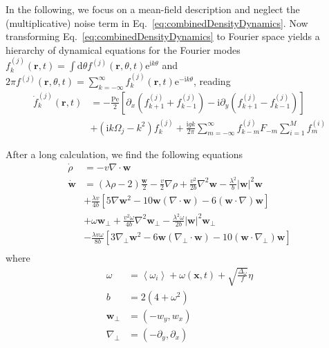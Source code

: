 \documentclass{article}
\begin{document}
In the following, we focus on a mean-field description and neglect the (multiplicative) noise term in Eq.~\eqref{eq:combinedDensityDynamics}. 
Now transforming Eq.~\eqref{eq:combinedDensityDynamics} to Fourier space yields a hierarchy of dynamical equations for the Fourier modes
$
f_k^{(j)}(\mathbf{r}, t)=\int\mathrm{d}\theta f^{(j)}(\mathbf{r},\theta,t)\mathrm{e}^{\mathrm{i}k\theta}
$
and
$
2\pi f^{(j)}(\mathbf{r},\theta ,t)=\sum_{k=-\infty}^{\infty}{f_{k}^{(j)}}(\mathbf{r},t)\mathrm{e}^{-\mathrm{i}k\theta}
$,
reading
\begin{equation}
    \begin{aligned}
        \dot{f}_k^{(j)}(\mathbf{r},t)&=-\frac{\mathrm{Pe}}{2}\left[\partial_x\left(f_{k+1}^{(j)}+f_{k-1}^{(j)}\right)-\mathrm{i}\partial_y\left(f_{k+1}^{(j)}-f_{k-1}^{(j)}\right)\right]\\
        &+ \left(\mathrm{i}k\Omega_j-k^2\right)f_k^{(j)}+\frac{\mathrm{i}gk}{2\pi}\sum_{m=-\infty}^\infty f_{k-m}^{(j)}F_{-m}\sum_{i=1}^Mf_m^{(i)}
    \end{aligned}
\end{equation}


After a long calculation, we find the following equations
\begin{equation}
    \label{eq:hydrodynamicEq}
    \begin{aligned}
        \dot{\rho}&=-v\nabla \cdot \mathbf{w}\\
        \dot{\mathbf{w}}&=(\lambda \rho -2)\frac{\mathbf{w}}{2}-\frac{v}{2}\nabla \rho +\frac{v^2}{2b}\nabla ^2\mathbf{w}-\frac{\lambda ^2}{b}|\mathbf{w}|^2\mathbf{w}\\
        &+\frac{\lambda v}{4b}\left[ 5\nabla \mathbf{w}^2-10\mathbf{w}(\nabla \cdot \mathbf{w})-6(\mathbf{w}\cdot \nabla )\mathbf{w} \right]\\
        &+\omega \mathbf{w}_{\bot}+\frac{v^2\omega}{4b}\nabla ^2\mathbf{w}_{\bot}-\frac{\lambda ^2\omega}{2b}|\mathbf{w}|^2\mathbf{w}_{\bot}\\
        &-\frac{\lambda v\omega}{8b}\left[ 3\nabla _{\bot}\mathbf{w}^2-6\mathbf{w}\left( \nabla _{\bot}\cdot \mathbf{w} \right) -10\left( \mathbf{w}\cdot \nabla _{\bot} \right) \mathbf{w} \right]\\
    \end{aligned}
\end{equation}
where 
\begin{equation}
    \begin{aligned}
        \omega &=\left< \omega _i \right> +\omega \left( \mathbf{x},t \right) +\sqrt{\frac{\Delta _{\omega}}{f}}\eta\\
        b&=2\left( 4+\omega ^2 \right)\\
        \mathbf{w}_{\bot}&=\left( -w_y,w_x \right)\\
        \nabla _{\bot}&=\left( -\partial _y,\partial _x \right)\\
    \end{aligned}
\end{equation}
\end{document}

